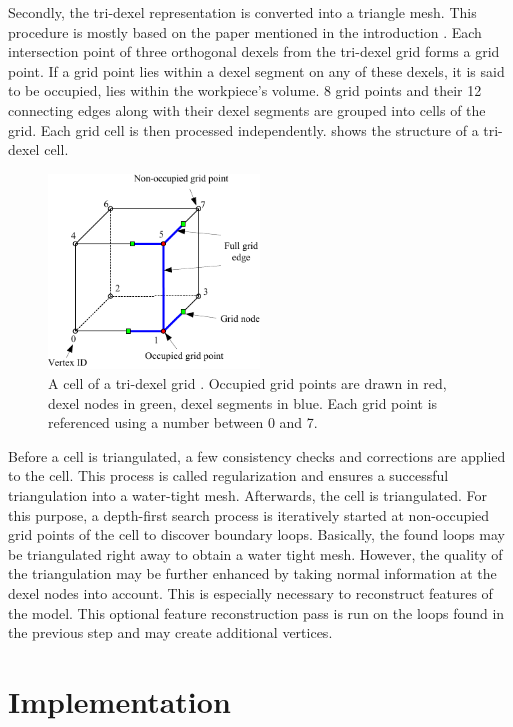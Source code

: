 Secondly, the tri-dexel representation is converted into a triangle mesh.
This procedure is mostly based on the paper mentioned in the introduction \cite{tridexel_reconstruction}.
Each intersection point of three orthogonal dexels from the tri-dexel grid forms a grid point.
If a grid point lies within a dexel segment on any of these dexels, it is said to be occupied, \ie lies within the workpiece's volume.
8 grid points and their 12 connecting edges along with their dexel segments are grouped into cells of the grid.
Each grid cell is then processed independently.
 shows the structure of a tri-dexel cell.
%
\begin{figure}
	\centering
	\includegraphics[width=0.5\textwidth]{images/tri_dexel_cell}
	\caption{
		A cell of a tri-dexel grid \cite{tridexel_reconstruction}.
		Occupied grid points are drawn in red, dexel nodes in green, dexel segments in blue.
		Each grid point is referenced using a number between 0 and 7.
	}
	\label{fig:tri_dexel_cell}
\end{figure}
%
Before a cell is triangulated, a few consistency checks and corrections are applied to the cell.
This process is called regularization and ensures a successful triangulation into a water-tight mesh.
Afterwards, the cell is triangulated.
For this purpose, a depth-first search process is iteratively started at non-occupied grid points of the cell to discover boundary loops.
Basically, the found loops may be triangulated right away to obtain a water tight mesh.
However, the quality of the triangulation may be further enhanced by taking normal information at the dexel nodes into account.
This is especially necessary to reconstruct features of the model.
This optional feature reconstruction pass is run on the loops found in the previous step and may create additional vertices.

\section{Implementation}
\label{sec:tri_dexel_implementation}

